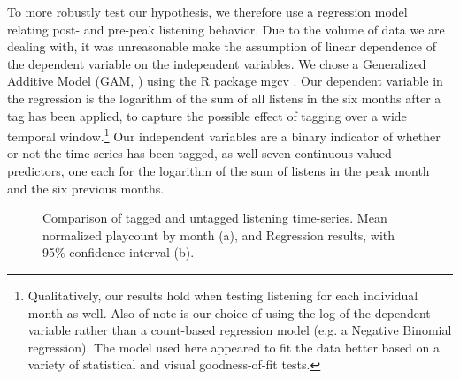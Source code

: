 To more robustly test our hypothesis, we therefore use a regression model relating post- and pre-peak listening behavior. Due to the volume of data we are dealing with, it was unreasonable make the assumption of linear dependence of the dependent variable on the independent variables. We chose a Generalized Additive Model (GAM, \cite{hastie1990generalized}) using the R package mgcv \cite{wood2001mgcv}. Our dependent variable in the regression is the logarithm of the sum of all listens in the six months after a tag has been applied, to capture the possible effect of tagging over a wide temporal window.\footnote{Qualitatively, our results hold when testing listening for each individual month as well. Also of note is our choice of using the log of the dependent variable rather than a count-based regression model (e.g. a Negative Binomial regression). The model used here appeared to fit the data better based on a variety of statistical and visual goodness-of-fit tests.} Our independent variables are a binary indicator of whether or not the time-series has been tagged, as well seven continuous-valued predictors, one each for the logarithm of the sum of listens in the peak month and the six previous months.   

  \begin{figure}
    \hfill
    \caption{Comparison of tagged and untagged listening time-series. Mean normalized playcount by month (a), and Regression results, with 95\% confidence interval (b).}
    \label{fig:regressionFigs}
  \end{figure}

